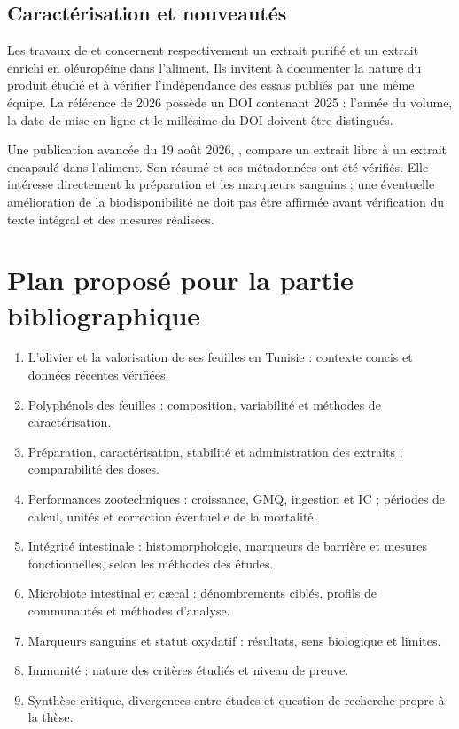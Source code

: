 \documentclass[11pt,a4paper]{article}
\begin{document}
\subsection{Caractérisation et nouveautés}

Les travaux de \citet{Vasilopoulou2023} et \citet{Vasilopoulou2026} concernent respectivement un extrait purifié et un extrait enrichi en oléuropéine dans l'aliment. Ils invitent à documenter la nature du produit étudié et à vérifier l'indépendance des essais publiés par une même équipe. La référence de 2026 possède un DOI contenant 2025 : l'année du volume, la date de mise en ligne et le millésime du DOI doivent être distingués.

Une publication avancée du 19 août 2026, \citet{Hiba2026}, compare un extrait libre à un extrait encapsulé dans l'aliment. Son résumé et ses métadonnées ont été vérifiés. Elle intéresse directement la préparation et les marqueurs sanguins ; une éventuelle amélioration de la biodisponibilité ne doit pas être affirmée avant vérification du texte intégral et des mesures réalisées.

\clearpage
\section{Plan proposé pour la partie bibliographique}

\begin{enumerate}
\item L'olivier et la valorisation de ses feuilles en Tunisie : contexte concis et données récentes vérifiées.
\item Polyphénols des feuilles : composition, variabilité et méthodes de caractérisation.
\item Préparation, caractérisation, stabilité et administration des extraits ; comparabilité des doses.
\item Performances zootechniques : croissance, GMQ, ingestion et IC ; périodes de calcul, unités et correction éventuelle de la mortalité.
\item Intégrité intestinale : histomorphologie, marqueurs de barrière et mesures fonctionnelles, selon les méthodes des études.
\item Microbiote intestinal et cæcal : dénombrements ciblés, profils de communautés et méthodes d'analyse.
\item Marqueurs sanguins et statut oxydatif : résultats, sens biologique et limites.
\item Immunité : nature des critères étudiés et niveau de preuve.
\item Synthèse critique, divergences entre études et question de recherche propre à la thèse.
\end{enumerate}
\end{document}
